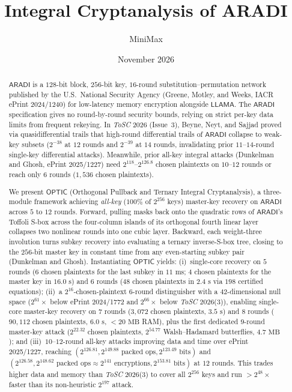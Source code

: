 \documentclass[11pt,a4paper]{article}
\title{\textbf{Integral Cryptanalysis of ARADI}}
\author{MiniMax}
\date{November 2026}
\theoremstyle{definition}
\theoremstyle{remark}
\newcommand{\ARADI}{\mathsf{ARADI}}
\newcommand{\LLAMA}{\mathsf{LLAMA}}
\newcommand{\OPTIC}{\mathsf{OPTIC}}
\begin{document}
\maketitle

\begin{abstract}
$\ARADI$ is a $128$-bit block, $256$-bit key, $16$-round substitution--permutation network published by the U.S.\ National Security Agency (Greene, Motley, and Weeks, IACR ePrint 2024/1240) for low-latency memory encryption alongside $\LLAMA$. The $\ARADI$ specification gives no round-by-round security bounds, relying on strict per-key data limits from frequent rekeying. In \emph{ToSC} 2026 (Issue~3), Beyne, Neyt, and Sajjad proved via quasidifferential trails that high-round differential trails of $\ARADI$ collapse to weak-key subsets ($2^{-38}$ at $12$ rounds and $2^{-39}$ at $14$ rounds, invalidating prior $11$--$14$-round single-key differential attacks). Meanwhile, prior all-key integral attacks (Dunkelman and Ghosh, ePrint 2025/1227) need $2^{118}$--$2^{126.8}$ chosen plaintexts on $10$--$12$ rounds or reach only $6$ rounds ($1{,}536$ chosen plaintexts).

We present $\OPTIC$ (Orthogonal Pull\-back and Ternary Integral Crypt\-analysis), a three-module framework achieving \emph{all-key} ($100\%$ of $2^{256}$ keys) master-key recovery on $\ARADI$ across $5$ to $12$ rounds. Forward, pulling masks back onto the quadratic rows of $\ARADI$'s Toffoli S-box across the four-column islands of its orthogonal fourth linear layer collapses two nonlinear rounds into one cubic layer. Backward, each weight-three involution turns subkey recovery into evaluating a ternary inverse-S-box tree, closing to the $256$-bit master key in constant time from any even-starting subkey pair (Dunkelman and Ghosh). Instantiating $\OPTIC$ yields: (i)~single-core recovery on $5$ rounds ($6$ chosen plaintexts for the last subkey in $11\text{ ms}$; $4$ chosen plaintexts for the master key in $16.0\text{ s}$) and $6$ rounds ($48$ chosen plaintexts in $2.4\text{ s}$ via $198$ certified equations); (ii)~a $2^{16}$-chosen-plaintext $6$-round distinguisher with a $42$-dimensional null space ($2^{61}\times$ below ePrint 2024/1772 and $2^{66}\times$ below \emph{ToSC} 2026(3)), enabling single-core master-key recovery on $7$ rounds ($3{,}072$ chosen plaintexts, $3.5\text{ s}$) and $8$ rounds ($90{,}112$ chosen plaintexts, $6.0\text{ s}$, $<20\text{ MB}$ RAM), plus the first dedicated $9$-round master-key attack ($2^{22.32}$ chosen plaintexts, $2^{54.77}$ Walsh--Hadamard butterflies, $4.7\text{ MB}$); and (iii)~$10$--$12$-round all-key attacks improving data and time over ePrint 2025/1227, reaching $(2^{126.81}, 2^{149.88}\text{ packed ops}, 2^{123.49}\text{ bits})$ and $(2^{126.58}, 2^{148.62}\text{ packed ops} \approx 2^{141}\text{ encryptions}, 2^{153.81}\text{ bits})$ at $12$ rounds. This trades higher data and memory than \emph{ToSC} 2026(3) to cover all $2^{256}$ keys and run $>2^{48}\times$ faster than its non-heuristic $2^{197}$ attack.
\end{abstract}
\end{document}
